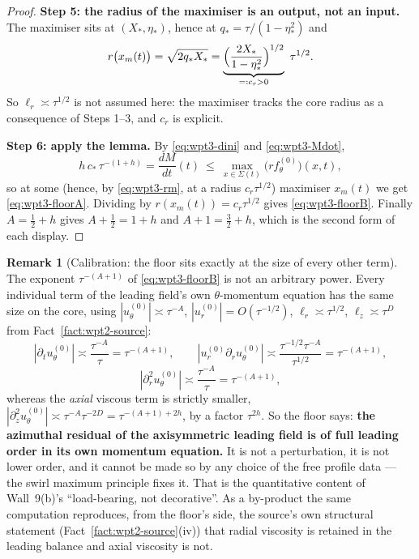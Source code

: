 \documentclass[11pt]{article}
\theoremstyle{definition}
\newtheorem{remark}[theorem]{Remark}
\theoremstyle{remark}
\newcommand{\abs}[1]{\left|#1\right|}
\begin{document}
\begin{proof}
  \textbf{Step 5: the radius of the maximiser is an output, not an input.}
  The maximiser sits at $(X_*,\eta_*)$, hence at
  $q_*=\tau/(1-\eta_*^2)$ and
  \begin{equation}\label{eq:wpt3-rm}
    r\bigl(x_m(t)\bigr)=\sqrt{2q_*X_*}
      =\underbrace{\Bigl(\frac{2X_*}{1-\eta_*^2}\Bigr)^{1/2}}_{=:c_r>0}
        \ \tau^{1/2}.
  \end{equation}
  So $\ell_r\asymp\tau^{1/2}$ is not assumed here: the maximiser tracks the
  core radius as a consequence of Steps 1--3, and $c_r$ is explicit.

  \textbf{Step 6: apply the lemma.} By \eqref{eq:wpt3-dini} and
  \eqref{eq:wpt3-Mdot},
  \[
    h\,c_*\,\tau^{-(1+h)}=\frac{dM}{dt}(t)
      \ \leq\ \max_{x\in\Sigma(t)}\bigl(rf^{(0)}_\theta\bigr)(x,t),
  \]
  so at some (hence, by \eqref{eq:wpt3-rm}, at a radius $c_r\tau^{1/2}$)
  maximiser $x_m(t)$ we get \eqref{eq:wpt3-floorA}. Dividing by
  $r(x_m(t))=c_r\tau^{1/2}$ gives \eqref{eq:wpt3-floorB}. Finally
  $A=\tfrac12+h$ gives $A+\tfrac12=1+h$ and $A+1=\tfrac32+h$, which is the
  second form of each display.
\end{proof}

\begin{remark}[Calibration: the floor sits exactly at the size of every other
  term]\label{rem:wpt3-calibration}
  The exponent $\tau^{-(A+1)}$ of \eqref{eq:wpt3-floorB} is not an arbitrary
  power. Every individual term of the leading field's own $\theta$-momentum
  equation has the same size on the core, using
  $\abs{u^{(0)}_\theta}\asymp\tau^{-A}$,
  $\abs{u^{(0)}_r}=O(\tau^{-1/2})$,
  $\ell_r\asymp\tau^{1/2}$, $\ell_z\asymp\tau^{D}$ from
  Fact~\ref{fact:wpt2-source}:
  \[
    \abs{\partial_tu^{(0)}_\theta}\asymp\frac{\tau^{-A}}{\tau}
      =\tau^{-(A+1)},\qquad
    \abs{u^{(0)}_r\partial_ru^{(0)}_\theta}
      \asymp\frac{\tau^{-1/2}\tau^{-A}}{\tau^{1/2}}=\tau^{-(A+1)},
  \]
  \[
    \abs{\partial_r^2u^{(0)}_\theta}\asymp\frac{\tau^{-A}}{\tau}
      =\tau^{-(A+1)} ,
  \]
  whereas the \emph{axial} viscous term is strictly smaller,
  $\abs{\partial_z^2u^{(0)}_\theta}\asymp\tau^{-A}\tau^{-2D}
    =\tau^{-(A+1)+2h}$,
  by a factor $\tau^{2h}$. So the floor says: \textbf{the azimuthal residual
  of the axisymmetric leading field is of full leading order in its own
  momentum equation.} It is not a perturbation, it is not lower order, and it
  cannot be made so by any choice of the free profile data --- the swirl
  maximum principle fixes it. That is the quantitative content of Wall~9(b)'s
  ``load-bearing, not decorative''. As a by-product the same computation
  reproduces, from the floor's side, the source's own structural statement
  (Fact~\ref{fact:wpt2-source}(iv)) that radial viscosity is retained in the
  leading balance and axial viscosity is not.
\end{remark}
\end{document}

